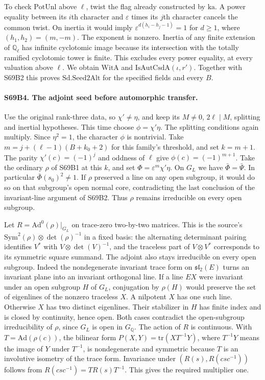To check $\mathrm{PotUnl}$ above $\ell$, twist the flag already
constructed by $\mathrm{ka}$. A power equality between its $i$th
character and $\varepsilon$ times its $j$th character cancels
the common twist. On inertia it would imply
$\varepsilon^{d(h_i-h_j-1)}=1$ for $d\ge1$, where
$(h_1,h_2)=(m,-m)$. The exponent is nonzero. Inertia of any
finite extension of $\mathbb Q_\ell$ has infinite cyclotomic image
because its intersection with the totally ramified cyclotomic tower
is finite. This excludes every power equality, at every valuation
above $\ell$. We obtain $\mathrm{WitA}$ and
$\mathrm{IsAutCsdA}(\iota,r')$. Together with S69B2 this proves
$\mathrm{Sd.Seed2Alt}$ for the specified fields and every $B$.

\paragraph{S69B4. The adjoint seed before automorphic transfer.}
Use the original rank-three data, so $\chi'\ne\eta$, and keep its
$M\ne0$, $2\ell\mid M$, splitting and inertial hypotheses.
This time choose $\phi=\chi'\eta$. The splitting conditions
again multiply. Since $\eta^2=1$, the character $\phi$ is nontrivial.
Take $m=j+(\ell-1)(B+k_0+2)$ for this family's threshold, and set
$k=m+1$. The parity $\chi'(c)=(-1)^j$ and oddness of $\ell$
give $\phi(c)=(-1)^{m+1}$. Take the ordinary $\rho$ of S69B1 at
this $k$, and set $\Phi=\varepsilon^m\chi'\eta$. On $G_L$ we
have $\bar\Phi=\bar\Psi$. In particular $\bar\Phi(s_0)^2\ne1$.
If $\rho$ preserved a line on any open subgroup, it would do so on
that subgroup's open normal core, contradicting the last conclusion
of the invariant-line argument of S69B2. Thus $\rho$ remains
irreducible on every open subgroup.

Let $R=\mathrm{Ad}^0(\rho)|_{G_L}$ on trace-zero two-by-two matrices.
This is the source's $\mathrm{Sym}^2(\rho)\otimes\det(\rho)^{-1}$
in a fixed basis: the alternating determinant pairing identifies
$V^*$ with $V\otimes\det(V)^{-1}$, and the traceless part of
$V\otimes V^*$ corresponds to its symmetric square summand.
The adjoint also stays irreducible on every open subgroup.
Indeed the nondegenerate invariant trace form on
$\mathfrak{sl}_2(E)$ turns an invariant plane into an invariant
orthogonal line. If a line $EX$ were invariant under an open
subgroup $H$ of $G_L$, conjugation by $\rho(H)$ would preserve
the set of eigenlines of the nonzero traceless $X$. A nilpotent
$X$ has one such line. Otherwise $X$ has two distinct eigenlines.
Their stabilizer in $H$ has finite index and is closed by continuity,
hence open. Both cases contradict the open-subgroup irreducibility
of $\rho$, since $G_L$ is open in $G_{\mathbb Q}$. The action of
$R$ is continuous. With $T=\mathrm{Ad}(\rho(c))$, the bilinear
form $P(X,Y)=\mathrm{tr}(X T^{-1}Y)$, where $T^{-1}Y$ means
the image of $Y$ under $T^{-1}$, is nondegenerate and symmetric
because $T$ is an involutive isometry of the trace form. Invariance
under $(R(s),R(csc^{-1}))$ follows from $R(csc^{-1})=TR(s)T^{-1}$.
This gives the required multiplier one.

